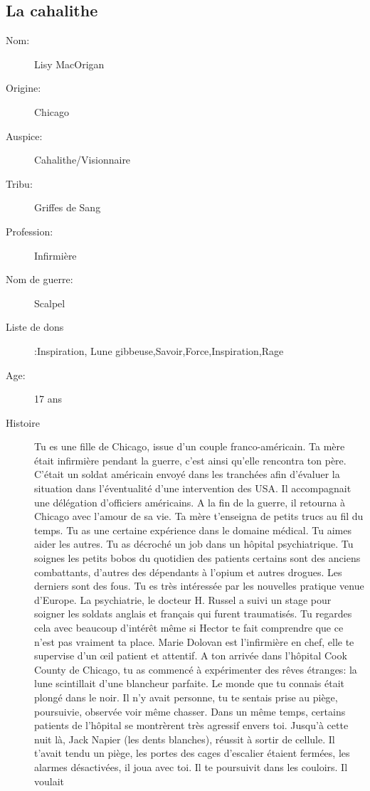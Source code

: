 \documentclass[oneside,12pt]{book}
\begin{document}
\begin{flushleft}
\clearpage
\section{La cahalithe}
\begin{description}
\item[Nom:]{Lisy MacOrigan}
\item[Origine:]{Chicago}
\item[Auspice:]{Cahalithe/Visionnaire}
\item[Tribu:]{Griffes de Sang}
\item[Profession:]{Infirmière}
\item[Nom de guerre:]{Scalpel}
\item[Liste de dons]:Inspiration, Lune gibbeuse,Savoir,Force,Inspiration,Rage
\item[Age:]{17 ans}
\item[Histoire]{Tu es une fille de Chicago, issue d'un couple franco-américain. 
Ta mère était infirmière pendant la guerre, c'est ainsi qu'elle rencontra ton père.
C'était un soldat américain envoyé dans les tranchées afin d'évaluer la situation dans l'éventualité d'une intervention des USA. 
Il accompagnait une délégation d'officiers
américains. A la fin de la guerre, il retourna à Chicago avec l'amour de sa vie. 
Ta mère t'enseigna de petits trucs au fil du temps. Tu as une certaine expérience dans le domaine médical.
Tu aimes aider les autres. Tu as décroché un job dans un hôpital psychiatrique. 
Tu soignes les petits bobos du quotidien des patients certains sont des anciens combattants, d'autres des dépendants à l'opium et autres drogues. 
Les derniers sont des fous. Tu es très intéressée par les nouvelles pratique venue d'Europe.
La psychiatrie, le docteur H. Russel a suivi un stage pour soigner les soldats anglais et français qui furent traumatisés. 
Tu regardes cela avec beaucoup d'intérêt même si Hector te fait comprendre que ce n'est pas vraiment ta place.
Marie Dolovan est l'infirmière en chef, elle te supervise d'un œil patient et attentif. 
A ton arrivée dans l'hôpital Cook County de Chicago, tu as commencé à expérimenter des rêves étranges:
la lune scintillait d'une blancheur parfaite. Le monde que tu connais était plongé dans le noir.
Il n'y avait personne, tu te sentais prise au piège, poursuivie, observée voir même chasser. 
Dans un même temps, certains patients de l'hôpital se montrèrent très agressif envers toi. 
Jusqu'à cette nuit là, Jack Napier (les dents blanches), réussit à sortir de cellule.
Il t'avait tendu un piège, les portes des cages d'escalier étaient fermées, les alarmes désactivées, il joua avec toi. Il te poursuivit dans les couloirs. Il voulait
}
\end{description}
\end{flushleft}
\end{document}
